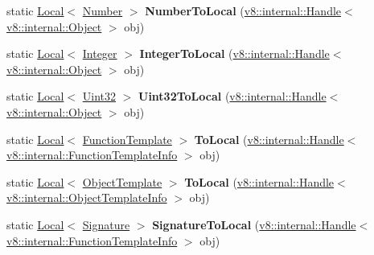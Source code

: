 \begin{DoxyCompactItemize}
\item 
static \hyperlink{classv8_1_1_local}{Local}$<$ \hyperlink{classv8_1_1_number}{Number} $>$ {\bfseries Number\+To\+Local} (\hyperlink{classv8_1_1internal_1_1_handle}{v8\+::internal\+::\+Handle}$<$ \hyperlink{classv8_1_1internal_1_1_object}{v8\+::internal\+::\+Object} $>$ obj)\hypertarget{classv8_1_1_utils_af85cbf57e5ba5902a96abd044c2fc76e}{}\label{classv8_1_1_utils_af85cbf57e5ba5902a96abd044c2fc76e}

\item 
static \hyperlink{classv8_1_1_local}{Local}$<$ \hyperlink{classv8_1_1_integer}{Integer} $>$ {\bfseries Integer\+To\+Local} (\hyperlink{classv8_1_1internal_1_1_handle}{v8\+::internal\+::\+Handle}$<$ \hyperlink{classv8_1_1internal_1_1_object}{v8\+::internal\+::\+Object} $>$ obj)\hypertarget{classv8_1_1_utils_aa6d14167b7e6d2d477a69e3507334c2a}{}\label{classv8_1_1_utils_aa6d14167b7e6d2d477a69e3507334c2a}

\item 
static \hyperlink{classv8_1_1_local}{Local}$<$ \hyperlink{classv8_1_1_uint32}{Uint32} $>$ {\bfseries Uint32\+To\+Local} (\hyperlink{classv8_1_1internal_1_1_handle}{v8\+::internal\+::\+Handle}$<$ \hyperlink{classv8_1_1internal_1_1_object}{v8\+::internal\+::\+Object} $>$ obj)\hypertarget{classv8_1_1_utils_a96bfef03b36b951d5ccdd1e7baa6bd68}{}\label{classv8_1_1_utils_a96bfef03b36b951d5ccdd1e7baa6bd68}

\item 
static \hyperlink{classv8_1_1_local}{Local}$<$ \hyperlink{classv8_1_1_function_template}{Function\+Template} $>$ {\bfseries To\+Local} (\hyperlink{classv8_1_1internal_1_1_handle}{v8\+::internal\+::\+Handle}$<$ \hyperlink{classv8_1_1internal_1_1_function_template_info}{v8\+::internal\+::\+Function\+Template\+Info} $>$ obj)\hypertarget{classv8_1_1_utils_ac33191d795c39e9e142e1a5d8feb751d}{}\label{classv8_1_1_utils_ac33191d795c39e9e142e1a5d8feb751d}

\item 
static \hyperlink{classv8_1_1_local}{Local}$<$ \hyperlink{classv8_1_1_object_template}{Object\+Template} $>$ {\bfseries To\+Local} (\hyperlink{classv8_1_1internal_1_1_handle}{v8\+::internal\+::\+Handle}$<$ \hyperlink{classv8_1_1internal_1_1_object_template_info}{v8\+::internal\+::\+Object\+Template\+Info} $>$ obj)\hypertarget{classv8_1_1_utils_aaf6cbfcde80e059e2a912e398709541a}{}\label{classv8_1_1_utils_aaf6cbfcde80e059e2a912e398709541a}

\item 
static \hyperlink{classv8_1_1_local}{Local}$<$ \hyperlink{classv8_1_1_signature}{Signature} $>$ {\bfseries Signature\+To\+Local} (\hyperlink{classv8_1_1internal_1_1_handle}{v8\+::internal\+::\+Handle}$<$ \hyperlink{classv8_1_1internal_1_1_function_template_info}{v8\+::internal\+::\+Function\+Template\+Info} $>$ obj)\hypertarget{classv8_1_1_utils_ab74c0bc535e34d63518eb66be02f7a24}{}\label{classv8_1_1_utils_ab74c0bc535e34d63518eb66be02f7a24}


\end{DoxyCompactItemize}

